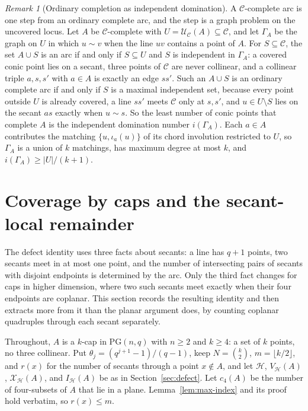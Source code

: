 \documentclass[11pt]{article}
\theoremstyle{definition}
\theoremstyle{remark}
\newtheorem{remark}[theorem]{Remark}
\newcommand{\PG}{\mathrm{PG}}
\newcommand{\cC}{\mathcal{C}}
\newcommand{\cH}{\mathcal{H}}
\newcommand{\cU}{\mathcal{U}}
\newcommand{\cX}{\mathcal{X}}
\newcommand{\IH}{I_{\cH}}
\begin{document}
\begin{remark}[Ordinary completion as independent domination]
\label{rem:independent-domination}
A $\cC$-complete arc is one step from an ordinary complete arc, and the
step is a graph problem on the uncovered locus.  Let $A$ be
$\cC$-complete with $U=\cU_{\cC}(A)\subseteq\cC$, and let $\Gamma_A$ be the
graph on $U$ in which $u\sim v$ when the line $uv$ contains a point of $A$.
For $S\subseteq\cC$, the set $A\cup S$ is an arc if and only if
$S\subseteq U$ and $S$ is independent in $\Gamma_A$: a covered conic point
lies on a secant, three points of $\cC$ are never collinear, and a
collinear triple $a,s,s'$ with $a\in A$ is exactly an edge $ss'$.  Such an
$A\cup S$ is an ordinary complete arc if and only if $S$ is a maximal
independent set, because every point outside $U$ is already covered, a
line $ss'$ meets $\cC$ only at $s,s'$, and $u\in U\setminus S$ lies on the
secant $as$ exactly when $u\sim s$.  So the least number of conic points
that complete $A$ is the independent domination number $i(\Gamma_A)$.
Each $a\in A$ contributes the matching $\{u,\iota_a(u)\}$ of its chord
involution restricted to $U$, so $\Gamma_A$ is a union of $k$ matchings,
has maximum degree at most $k$, and $i(\Gamma_A)\ge|U|/(k+1)$.
\end{remark}

\section{Coverage by caps and the secant-local remainder}
\label{sec:caps}

The defect identity uses three facts about secants: a line has $q+1$
points, two secants meet in at most one point, and the number of
intersecting pairs of secants with disjoint endpoints is determined by the
arc.  Only the third fact changes for caps in higher dimension, where two
such secants meet exactly when their four endpoints are coplanar.  This
section records the resulting identity and then extracts more from it than
the planar argument does, by counting coplanar quadruples through each
secant separately.

Throughout, $A$ is a $k$-cap in $\PG(n,q)$ with $n\ge2$ and $k\ge4$: a set
of $k$ points, no three collinear.  Put
$\theta_j=(q^{j+1}-1)/(q-1)$, keep $N=\binom{k}{2}$,
$m=\lfloor k/2\rfloor$, and $r(x)$ for the number of secants through a
point $x\notin A$, and let $\cH$, $V_{\cH}(A)$, $\cX_{\cH}(A)$, and
$\IH(A)$ be as in Section~\ref{sec:defect}.  Let $c_4(A)$ be the number
of four-subsets of $A$ that lie in a plane.  Lemma~\ref{lem:max-index} and
its proof hold verbatim, so $r(x)\le m$.
\end{document}
